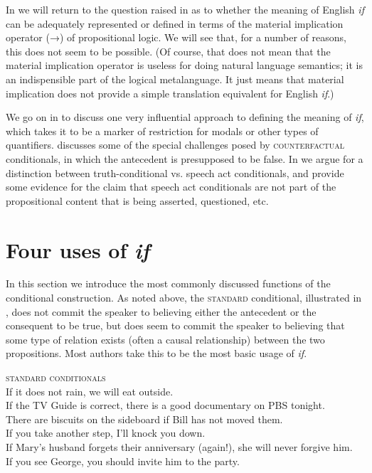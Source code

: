 In  we will return to the question raised in  as to whether the meaning of English \textit{if} can be adequately represented or defined in terms of the material implication operator (→) of propositional logic. We will see that, for a number of reasons, this does not seem to be possible. (Of course, that does not mean that the material implication operator is useless for doing natural language semantics; it is an indispensible part of the logical metalanguage. It just means that material implication does not provide a simple translation equivalent for English \textit{if}.)



We go on in  to discuss one very influential approach to defining the meaning of \textit{if}, which takes it to be a marker of restriction for modals or other types of quantifiers.  discusses some of the special challenges posed by \textsc{counterfactual} conditionals, in which the antecedent is presupposed to be false. In  we argue for a distinction between truth-conditional vs. speech act conditionals, and provide some evidence for the claim that speech act conditionals are not part of the propositional content that is being asserted, questioned, etc.


\section{Four uses of \textit{if}}\label{sec:19.2}

In this section we introduce the most commonly discussed functions of the conditional construction. As noted above, the \textsc{standard} conditional, illustrated in , does not commit the speaker to believing either the antecedent or the consequent to be true, but does seem to commit the speaker to believing that some type of relation exists (often a causal relationship) between the two propositions. Most authors take this to be the most basic usage of \textit{if}.


\ea \label{ex:19.2}
\textsc{standard conditionals}\\
\ea  If it does not rain, we will eat outside.\\
\ex If the TV Guide is correct, there is a good documentary on PBS tonight.\\
\ex There are biscuits on the sideboard if Bill has not moved them.\\
\ex If you take another step, I’ll knock you down.\\
\ex If Mary’s husband forgets their anniversary (again!), she will never forgive him.\\
\ex If you see George, you should invite him to the party.
                       \z
\z


